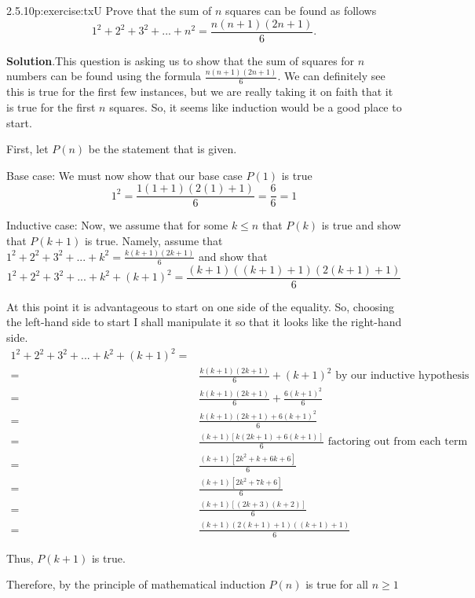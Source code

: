 \documentclass[twoside,11pt,]{book}
\newcommand{\blocktitlefont}{\relax}
\numberwithin{equation}{chapter}
\newcommand{\amp}{&}
\begin{document}
\begin{divisionsolution}{2.5.10}{}{p:exercise:txU}%
Prove that the sum of \(n\) squares can be found as follows%
\begin{equation*}
1^2 +2^2 +3^2+...+n^2 = \frac{n(n+1)(2n+1)}{6}\text{.}
\end{equation*}
%
\par\smallskip%
\noindent\textbf{\blocktitlefont Solution}.\quad{}This question is asking us to show that the sum of squares for \(n\) numbers can be found using the formula \(\frac{n(n+1)(2n+1)}{6}\). We can definitely see this is true for the first few instances, but we are really taking it on faith that it is true for the first \(n\) squares. So, it seems like induction would be a good place to start.%
\begin{solutionproof}
First, let \(P(n)\) be the statement that is given.%
\par
Base case: We must now show that our base case \(P(1)\) is true%
\begin{equation*}
1^2 = \frac{1(1+1)(2(1)+1)}{6} = \frac{6}{6} =1
\end{equation*}
%
\par
Inductive case: Now, we assume that for some \(k\leq n\) that \(P(k)\) is true and show that \(P(k+1)\) is true. Namely, assume that \(1^2 +2^2 +3^2+...+k^2 = \frac{k(k+1)(2k+1)}{6}\) and show that%
\begin{equation*}
1^2 +2^2 +3^2+...+k^2+{(k+1)}^2 = \frac{(k+1)((k+1)+1)(2(k+1)+1)}{6}
\end{equation*}
%
\par
At this point it is advantageous to start on one side of the equality. So, choosing the left-hand side to start I shall manipulate it so that it looks like the right-hand side.%
\begin{align*}
1^2 +2^2 +3^2+...+k^2+{(k+1)}^2 =\\
= \amp \frac{k(k+1)(2k+1)}{6} +(k+1)^2 \mbox{ by our inductive hypothesis}\\
= \amp \frac{k(k+1)(2k+1)}{6} +\frac{6(k+1)^2}{6}\\
= \amp \frac{k(k+1)(2k+1)+6(k+1)^2}{6}\\
= \amp \frac{(k+1)[k(2k+1)+6(k+1)]}{6} \mbox{ factoring out  from each term}\\
= \amp \frac{(k+1)[2k^2+k+6k+6]}{6}\\
= \amp \frac{(k+1)[2k^2+7k+6]}{6}\\
= \amp \frac{(k+1)[(2k+3)(k+2)]}{6}\\
= \amp \frac{(k+1)(2(k+1)+1)((k+1)+1)}{6}
\end{align*}
%
\par
Thus, \(P(k+1)\) is true.%
\par
Therefore, by the principle of mathematical induction \(P(n)\) is true for all \(n \geq 1\)%
\end{solutionproof}
\end{divisionsolution}%
\end{document}
